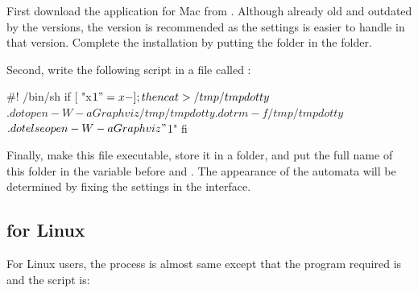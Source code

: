 First download the  application for Mac from
.
Although already old and outdated by the  versions, the
 version is recommended as the settings is easier to
handle in that version.
Complete the installation by putting the  folder
in the  folder.

Second, write the following script in a file called :
\begin{shell}
#! /bin/sh
if [ "x$1" = x- ]; then
 cat >/tmp/tmpdotty$$.dot
 open -W -a Graphviz /tmp/tmpdotty$$.dot
 rm -f /tmp/tmpdotty$$.dot
else
 open -W -a Graphviz "$1"
fi
\end{shell}%

Finally, make this file executable, store it in a folder, and put the
full name of this folder in the  variable before
 and .
The appearance of the automata will be determined by fixing the
settings in the interface.


\subsection{ for Linux}

For Linux users, the process is almost same except that the program 
required is  and the  script is:

%


